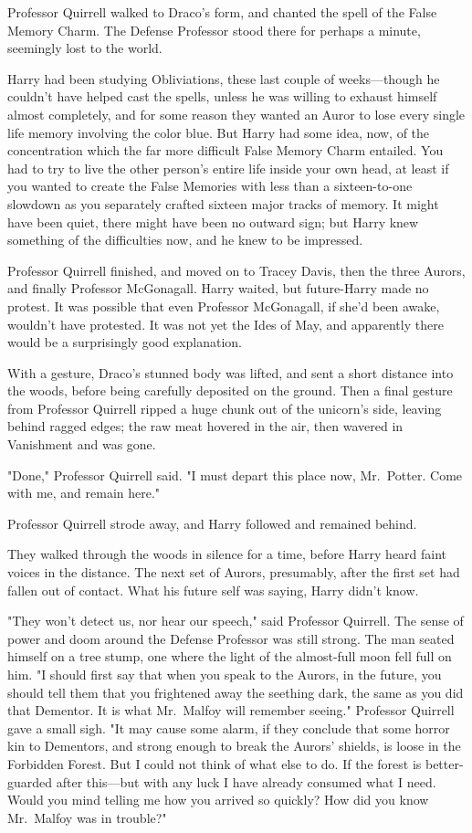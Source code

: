 Professor Quirrell walked to Draco's form, and chanted the spell of the False
Memory Charm. The Defense Professor stood there for perhaps a minute, seemingly
lost to the world.

Harry had been studying Obliviations, these last couple of weeks---though he
couldn't have helped cast the spells, unless he was willing to exhaust himself
almost completely, and for some reason they wanted an Auror to lose every
single life memory involving the color blue. But Harry had some idea, now, of
the concentration which the far more difficult False Memory Charm entailed. You
had to try to live the other person's entire life inside your own head, at
least if you wanted to create the False Memories with less than a
sixteen-to-one slowdown as you separately crafted sixteen major tracks of
memory. It might have been quiet, there might have been no outward sign; but
Harry knew something of the difficulties now, and he knew to be impressed.

Professor Quirrell finished, and moved on to Tracey Davis, then the three
Aurors, and finally Professor McGonagall. Harry waited, but future-Harry made
no protest. It was possible that even Professor McGonagall, if she'd been
awake, wouldn't have protested. It was not yet the Ides of May, and apparently
there would be a surprisingly good explanation.

With a gesture, Draco's stunned body was lifted, and sent a short distance into
the woods, before being carefully deposited on the ground. Then a final gesture
from Professor Quirrell ripped a huge chunk out of the unicorn's side, leaving
behind ragged edges; the raw meat hovered in the air, then wavered in
Vanishment and was gone.

"Done," Professor Quirrell said. "I must depart this place now, Mr.~Potter.
Come with me, and remain here."

Professor Quirrell strode away, and Harry followed and remained behind.

They walked through the woods in silence for a time, before Harry heard faint
voices in the distance. The next set of Aurors, presumably, after the first set
had fallen out of contact. What his future self was saying, Harry didn't know.

"They won't detect us, nor hear our speech," said Professor Quirrell. The sense
of power and doom around the Defense Professor was still strong. The man seated
himself on a tree stump, one where the light of the almost-full moon fell full
on him. "I should first say that when you speak to the Aurors, in the future,
you should tell them that you frightened away the seething dark, the same as
you did that Dementor. It is what Mr.~Malfoy will remember seeing." Professor
Quirrell gave a small sigh. "It may cause some alarm, if they conclude that
some horror kin to Dementors, and strong enough to break the Aurors' shields,
is loose in the Forbidden Forest. But I could not think of what else to do. If
the forest is better-guarded after this---but with any luck I have already
consumed what I need. Would you mind telling me how you arrived so quickly? How
did you know Mr.~Malfoy was in trouble?"

